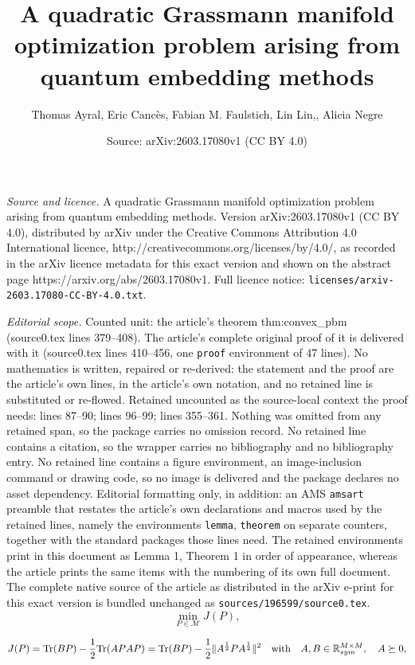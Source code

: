 \documentclass[10pt,a4paper]{amsart}
\title{A quadratic Grassmann manifold optimization problem arising from quantum embedding methods}
\author{Thomas Ayral, Eric Canc\`es, Fabian M. Faulstich, Lin Lin,, Alicia Negre}
\date{Source: arXiv:2603.17080v1 (CC BY 4.0)}
\def\R{\mathbb R}
\begin{document}
\maketitle

\noindent\emph{Source and licence.} A quadratic Grassmann manifold optimization problem arising from quantum embedding methods. Version arXiv:2603.17080v1 (CC BY 4.0), distributed by arXiv under the Creative Commons Attribution 4.0 International licence, http://creativecommons.org/licenses/by/4.0/, as recorded in the arXiv licence metadata for this exact version and shown on the abstract page https://arxiv.org/abs/2603.17080v1. Full licence notice: \texttt{licenses/arxiv-2603.17080-CC-BY-4.0.txt}.\par\smallskip

\noindent\textit{Editorial scope.} Counted unit: the article's theorem thm:convex\_pbm (source0.tex lines 379--408). The article's complete original proof of it is delivered with it (source0.tex lines 410--456, one \texttt{proof} environment of 47 lines). No mathematics is written, repaired or re-derived: the statement and the proof are the article's own lines, in the article's own notation, and no retained line is substituted or re-flowed.  Retained uncounted as the source-local context the proof needs: lines 87--90; lines 96--99; lines 355--361.  Nothing was omitted from any retained span, so the package carries no omission record.  No retained line contains a citation, so the wrapper carries no bibliography and no bibliography entry.  No retained line contains a figure environment, an image-inclusion command or drawing code, so no image is delivered and the package declares no asset dependency.  Editorial formatting only, in addition: an AMS \texttt{amsart} preamble that restates the article's own declarations and macros used by the retained lines, namely the environments \texttt{lemma}, \texttt{theorem} on separate counters, together with the standard packages those lines need.  The retained environments print in this document as Lemma 1, Theorem 1 in order of appearance, whereas the article prints the same items with the numbering of its own full document.  The complete native source of the article as distributed in the arXiv e-print for this exact version is bundled unchanged as \texttt{sources/196599/source0.tex}.
\begin{equation}
\label{eq:OptProblem}
\min_{P \in \mathcal M} J(P), 
\end{equation}

\begin{equation}
\label{eq:CostFunctionJ}
    J(P) = \text{Tr}(BP)- \frac{1}{2} \text{Tr}(A P A P) = \text{Tr}(BP) - \frac{1}{2} \lVert A^{\frac{1}{2}} P A^{\frac{1}{2}} \rVert^2 \quad \mbox{with} \quad A,B \in \R^{M \times M}_{\rm sym}, \quad A \succeq 0,
\end{equation}
\end{document}
